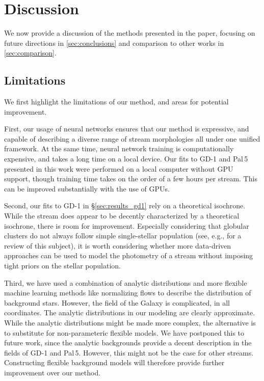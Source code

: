 \documentclass[twocolumn]{aastex631}
\newcommand{\stream}[1]{#1}
\begin{document}



\section{Discussion} \label{sec:discussion}

    We now provide a discussion of the methods presented in the paper, focusing
    on future directions in \autoref{sec:conclusions} and comparison to other
    works in \autoref{sec:comparison}.

    \subsection{Limitations}\label{sec:limitations}

        We first highlight the limitations of our method, and areas for
        potential improvement.
    
        First, our usage of neural networks ensures that our method is
        expressive, and capable of describing a diverse range of stream
        morphologies all under one unified framework. At the same time, neural
        network training is computationally expensive, and takes a long time on
        a local device. Our fits to \stream{GD-1} and \stream{Pal\,5} presented
        in this work were performed on a local computer without GPU support,
        though training time takes on the order of a few hours per stream. This
        can be improved substantially with the use of GPUs.
    
        Second, our fits to \stream{GD-1} in \S\ref{sec:results_gd1} rely on a
        theoretical isochrone. While the stream does appear to be decently
        characterized by a theoretical isochrone, there is room for improvement.
        Especially considering that globular clusters do not always follow
        simple single-stellar population (see, e.g.,
        \citealt{2022Univ....8..359M} for a review of this subject), it is worth
        considering whether more data-driven approaches can be used to model the
        photometry of a stream without imposing tight priors on the stellar
        population. 
    
        Third, we have used a combination of analytic distributions and more
        flexible machine learning methods like normalizing flows to describe the
        distribution of background stars. However, the field of the Galaxy is
        complicated, in all coordinates. The analytic distributions in our
        modeling are clearly approximate. While the analytic distributions might
        be made more complex, the alternative is to substitute for
        non-parameteric flexible models. We have postponed this to future work,
        since the analytic backgrounds provide a decent description in the
        fields of \stream{GD-1} and \stream{Pal\,5}. However, this might not be
        the case for other streams. Constructing flexible background models will
        therefore provide further improvement over our method.
    
\end{document}
